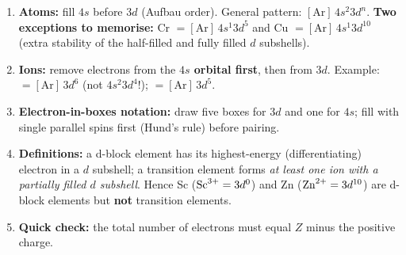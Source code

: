 \documentclass[11pt]{article}
\newcommand{\cle}[1]{{\popxbold\color{popdark}#1}}
\begin{document}
\begin{methode}
\begin{enumerate}
\item \textbf{Atoms:} fill $4s$ before $3d$ (Aufbau order). General pattern: $[\mathrm{Ar}]\,4s^2 3d^{n}$. \textbf{Two exceptions to memorise:} Cr $= [\mathrm{Ar}]\,4s^1 3d^5$ and Cu $= [\mathrm{Ar}]\,4s^1 3d^{10}$ (extra stability of the half-filled and fully filled $d$ subshells).
\item \textbf{Ions:} remove electrons from the \textbf{$4s$ orbital first}, then from $3d$. Example:  $= [\mathrm{Ar}]\,3d^6$ (not $4s^2 3d^4$!);  $= [\mathrm{Ar}]\,3d^5$.
\item \textbf{Electron-in-boxes notation:} draw five boxes for $3d$ and one for $4s$; fill with single parallel spins first (Hund's rule) before pairing.
\item \textbf{Definitions:} a \cle{d-block element} has its highest-energy (differentiating) electron in a $d$ subshell; a \cle{transition element} forms \emph{at least one ion with a partially filled $d$ subshell}. Hence Sc ($\ce{Sc^3+} = 3d^0$) and Zn ($\ce{Zn^2+} = 3d^{10}$) are d-block elements but \textbf{not} transition elements.
\item \textbf{Quick check:} the total number of electrons must equal $Z$ minus the positive charge.
\end{enumerate}
\end{methode}
\end{document}
